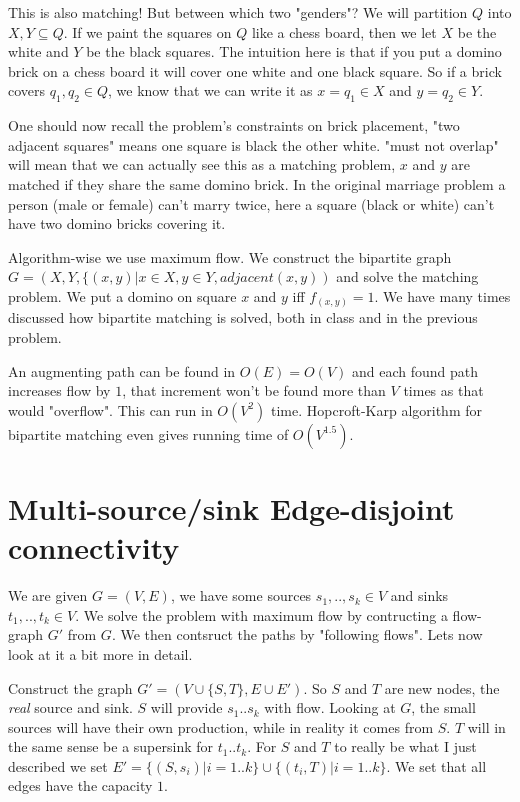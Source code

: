 \documentclass[a4paper,11pt]{article}
\begin{document}
This is also matching! But between which two "genders"?
We will partition $Q$ into $X,Y \subseteq Q$.
If we paint the squares on $Q$ like a chess board, then we let
$X$ be the white and $Y$ be the black squares.
The intuition here is that if you put a domino brick on a chess board
it will cover one white and one black square. So if a brick covers
$q_1,q_2 \in Q$, we know that we can write it as
$x=q_1 \in X$ and $y=q_2 \in Y$.

One should now recall the problem's
constraints on brick placement, "two adjacent squares" means one
square is black the other white. "must not overlap" will mean that
we can actually see this as a matching problem, $x$ and $y$ are
matched if they share the same domino brick. In the original
marriage problem a person (male or female) can't marry twice,
here a square (black or white) can't have two domino bricks covering it.

Algorithm-wise we use maximum flow.
We construct the bipartite graph
$G = (X, Y, \{(x,y) | x \in X, y \in Y, adjacent(x, y))$
and solve the matching problem. We put a domino on square $x$ and $y$
iff $f_{(x,y)} = 1$. We have many times discussed how bipartite
matching is solved, both in class and in the previous problem.

An augmenting path can be found in
$O(E)=O(V)$ and each found path increases flow by $1$, that increment
won't be found more than $V$ times as that would "overflow".
This can run in $O(V^2)$ time.
Hopcroft-Karp algorithm for bipartite matching even gives
running time of $O(V^{1.5})$.

\section{Multi-source/sink Edge-disjoint connectivity}

We are given $G = (V, E)$, we have some sources $s_1,..,s_k \in V$
and sinks $t_1,..,t_k \in V$. We solve the problem with maximum
flow by contructing a flow-graph $G'$ from $G$. We then contsruct the
paths by "following flows".
Lets now look at it a bit more in detail.

Construct the graph $G' = (V \cup \{S, T\}, E \cup E')$.
So $S$ and $T$ are new nodes, the \emph{real} source and sink.
$S$ will provide $s_1..s_k$ with flow.
Looking at $G$, the small sources will have their own
production, while in reality it comes from $S$. $T$ will
in the same sense be a supersink for $t_1..t_k$.
For $S$ and $T$ to really be what I just described we
set $E' = \{(S, s_i) | i=1..k\} \cup \{(t_i, T) | i=1..k\}$.
We set that all edges have the capacity $1$.
\end{document}
